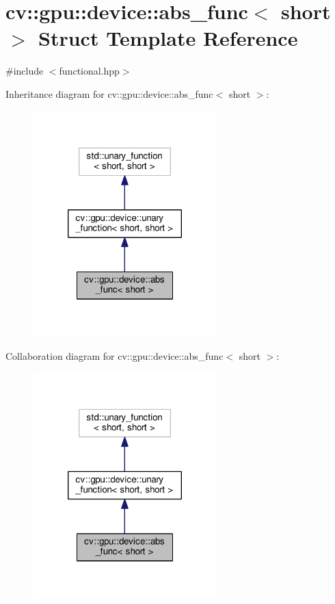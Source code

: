 \hypertarget{structcv_1_1gpu_1_1device_1_1abs__func_3_01short_01_4}{\section{cv\-:\-:gpu\-:\-:device\-:\-:abs\-\_\-func$<$ short $>$ Struct Template Reference}
\label{structcv_1_1gpu_1_1device_1_1abs__func_3_01short_01_4}
}


{\ttfamily \#include $<$functional.\-hpp$>$}



Inheritance diagram for cv\-:\-:gpu\-:\-:device\-:\-:abs\-\_\-func$<$ short $>$\-:\nopagebreak
\begin{figure}[H]
\begin{center}
\leavevmode
\includegraphics[width=202pt]{structcv_1_1gpu_1_1device_1_1abs__func_3_01short_01_4__inherit__graph}
\end{center}
\end{figure}


Collaboration diagram for cv\-:\-:gpu\-:\-:device\-:\-:abs\-\_\-func$<$ short $>$\-:\nopagebreak
\begin{figure}[H]
\begin{center}
\leavevmode
\includegraphics[width=202pt]{structcv_1_1gpu_1_1device_1_1abs__func_3_01short_01_4__coll__graph}
\end{center}
\end{figure}
